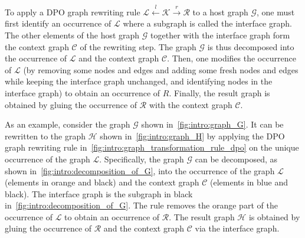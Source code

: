 To apply a DPO graph rewriting rule $\mathcal{L} \overset{l}{\leftarrow} \mathcal{K} \overset{r}{\rightarrow} \mathcal{R}$ to a host graph $\mathcal{G}$, one must first identify an occurrence of $\mathcal{L}$ where a subgraph is called the interface graph. The other elements of the host graph $\mathcal{G}$ together with the interface graph form the context graph $\mathcal{C}$ of the rewriting step.
The graph $\mathcal{G}$ is thus decomposed into the occurrence of $\mathcal{L}$ and the context graph $\mathcal{C}$. 
Then, one
   modifies the occurrence of $\mathcal{L}$ (by removing some nodes and edges and adding some fresh nodes and edges while keeping the interface graph unchanged, and identifying nodes in the interface graph)
to obtain an occurrence of $R$.
   Finally, the result graph is obtained by gluing the occurrence of $\mathcal{R}$ with the context graph $\mathcal{C}$.


As an example, consider the graph $\mathcal{G}$ shown in~\autoref{fig:intro:graph_G}. 
It can be rewritten to the graph $\mathcal{H}$ shown in~\autoref{fig:intro:graph_H} by applying the DPO graph rewriting rule in~\autoref{fig:intro:graph_transformation_rule_dpo} on the unique occurrence of the graph $\mathcal{L}$.
Specifically,
the graph $\mathcal{G}$ can be decomposed, as shown in~\autoref{fig:intro:decomposition_of_G}, into the occurrence of the graph $\mathcal{L}$ (elements in orange and black) and the context graph $\mathcal{C}$ (elements in blue and black). The interface graph is the subgraph in black in~\autoref{fig:intro:decomposition_of_G}. The rule removes the orange part of the occurrence of $\mathcal{L}$ to obtain an occurrence of $\mathcal{R}$. 
The result graph $\mathcal{H}$ is obtained by gluing the occurrence of $\mathcal{R}$ and the context graph $\mathcal{C}$ via the interface graph.
  
